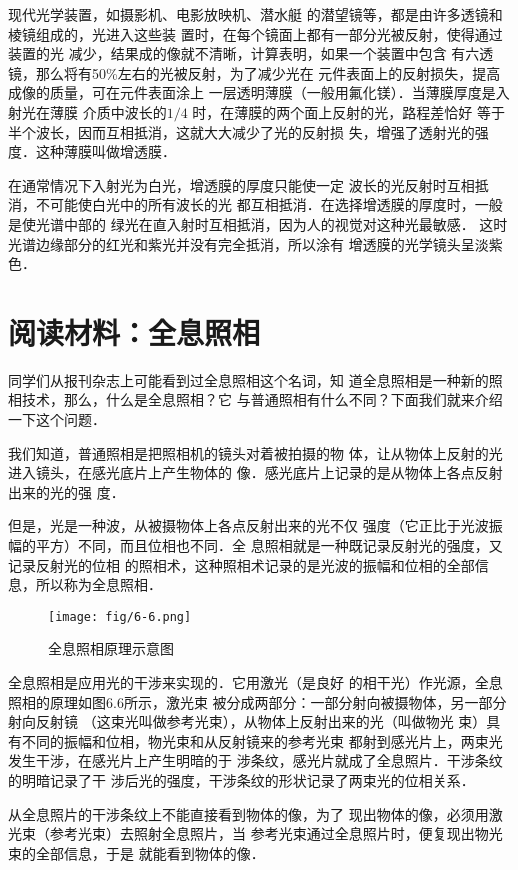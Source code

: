 现代光学装置，如摄影机、电影放映机、潜水艇
的潜望镜等，都是由许多透镜和棱镜组成的，光进入这些装
置时，在每个镜面上都有一部分光被反射，使得通过装置的光
减少，结果成的像就不清晰，计算表明，如果一个装置中包含
有六透镜，那么将有50\%左右的光被反射，为了减少光在
元件表面上的反射损失，提高成像的质量，可在元件表面涂上
一层透明薄膜（一般用氟化镁）．当薄膜厚度是入射光在薄膜
介质中波长的$1/4$
时，在薄膜的两个面上反射的光，路程差恰好
等于半个波长，因而互相抵消，这就大大减少了光的反射损
失，增强了透射光的强度．这种薄膜叫做增透膜．

在通常情况下入射光为白光，增透膜的厚度只能使一定
波长的光反射时互相抵消，不可能使白光中的所有波长的光
都互相抵消．在选择增透膜的厚度时，一般是使光谱中部的
绿光在直入射时互相抵消，因为人的视觉对这种光最敏感．
这时光谱边缘部分的红光和紫光并没有完全抵消，所以涂有
增透膜的光学镜头呈淡紫色．

\section*{阅读材料：全息照相}
同学们从报刊杂志上可能看到过全息照相这个名词，知
道全息照相是一种新的照相技术，那么，什么是全息照相？它
与普通照相有什么不同？下面我们就来介绍一下这个问题．

我们知道，普通照相是把照相机的镜头对着被拍摄的物
体，让从物体上反射的光进入镜头，在感光底片上产生物体的
像．感光底片上记录的是从物体上各点反射出来的光的强
度．

但是，光是一种波，从被摄物体上各点反射出来的光不仅
强度（它正比于光波振幅的平方）不同，而且位相也不同．全
息照相就是一种既记录反射光的强度，又记录反射光的位相
的照相术，这种照相术记录的是光波的振幅和位相的全部信
息，所以称为全息照相．
\begin{figure}[htp]\centering
    \texttt{[image: fig/6-6.png]}
    \caption{全息照相原理示意图}
    \end{figure}

全息照相是应用光的干涉来实现的．它用激光（是良好
的相干光）作光源，全息照相的原理如图6.6所示，激光束
被分成两部分：一部分射向被摄物体，另一部分射向反射镜
（这束光叫做参考光束），从物体上反射出来的光（叫做物光
束）具有不同的振幅和位相，物光束和从反射镜来的参考光束
都射到感光片上，两束光发生干涉，在感光片上产生明暗的于
涉条纹，感光片就成了全息照片．干涉条纹的明暗记录了干
涉后光的强度，干涉条纹的形状记录了两束光的位相关系．

从全息照片的干涉条纹上不能直接看到物体的像，为了
现出物体的像，必须用激光束（参考光束）去照射全息照片，当
参考光束通过全息照片时，便复现出物光束的全部信息，于是
就能看到物体的像．

